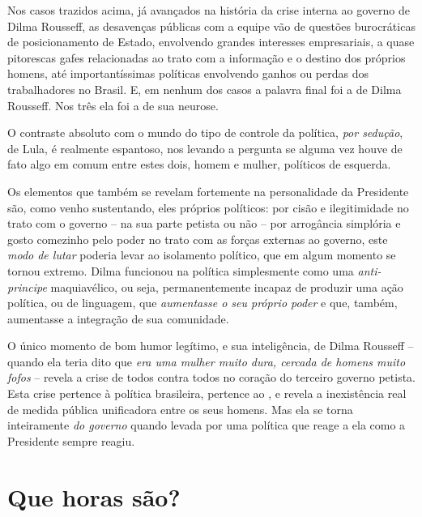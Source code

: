 Nos casos trazidos acima, já avançados na história da crise interna ao
governo de Dilma Rousseff, as desavenças públicas com a equipe vão de
questões burocráticas de posicionamento de Estado, envolvendo grandes
interesses empresariais, a quase pitorescas gafes relacionadas ao trato
com a informação e o destino dos próprios homens, até importantíssimas
políticas envolvendo ganhos ou perdas dos trabalhadores no Brasil. E, em
nenhum dos casos a palavra final foi a de Dilma Rousseff. Nos três ela
foi a de sua neurose.

O contraste absoluto com o mundo do tipo de controle da política,
\emph{por sedução}, de Lula, é realmente espantoso, nos levando a
pergunta se alguma vez houve de fato algo em comum entre estes dois,
homem e mulher, políticos de esquerda.

Os elementos que também se revelam fortemente na personalidade da
Presidente são, como venho sustentando, eles próprios políticos: por
cisão e ilegitimidade no trato com o governo -- na sua parte petista ou
não -- por arrogância simplória e gosto comezinho pelo poder no trato
com as forças externas ao governo, este \emph{modo de lutar} poderia
levar ao isolamento político, que em algum momento se tornou extremo.
Dilma funcionou na política simplesmente como uma \emph{anti-principe}
maquiavélico, ou seja, permanentemente incapaz de produzir uma ação
política, ou de linguagem, que \emph{aumentasse o seu próprio poder} e
que, também, aumentasse a integração de sua comunidade.

O único momento de bom humor legítimo, e sua inteligência, de Dilma
Rousseff -- quando ela teria dito que \emph{era uma mulher muito dura,
cercada de homens muito fofos} -- revela a crise de todos contra todos
no coração do terceiro governo petista. Esta crise pertence à política
brasileira, pertence ao , e revela a inexistência real de medida
pública unificadora entre os seus homens. Mas ela se torna inteiramente
\emph{do governo} quando levada por uma política que reage a ela como a
Presidente sempre reagiu.

  \section{Que horas são?}\label{que-horas-suxe3o}

